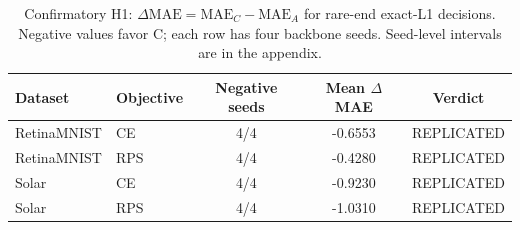 \begin{table}[t]
\centering
\caption{Confirmatory H1: $\Delta\mathrm{MAE}=\mathrm{MAE}_{C}-\mathrm{MAE}_{A}$ for rare-end exact-L1 decisions. Negative values favor C; each row has four backbone seeds. Seed-level intervals are in the appendix.}
\label{tab:confirmatory-h1}
\small
\begin{tabular}{llccc}
\toprule
Dataset & Objective & Negative seeds & Mean $\Delta$MAE & Verdict \\
\midrule
RetinaMNIST & CE  & 4/4 & -0.6553 & REPLICATED \\
RetinaMNIST & RPS & 4/4 & -0.4280 & REPLICATED \\
Solar & CE       & 4/4 & -0.9230 & REPLICATED \\
Solar & RPS      & 4/4 & -1.0310 & REPLICATED \\
\bottomrule
\end{tabular}
\end{table}
